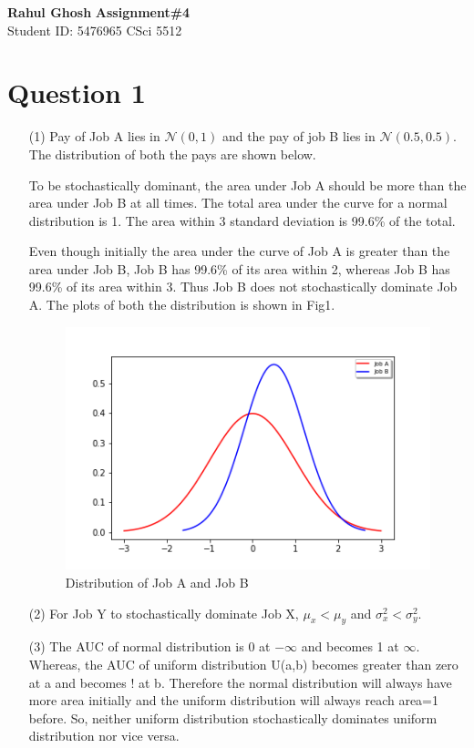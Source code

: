 \documentclass[letter, 10pt]{article}
\begin{document}
\noindent
\large \textbf{Rahul Ghosh} \hfill \textbf{Assignment\#4}\\
\normalsize Student ID: 5476965 \hfill CSci 5512\\

\section*{Question 1}
\begin{itemize}
    \item[(1)] Pay of Job A lies in $\mathcal{N}(0,1)$ and the pay of job B lies in $\mathcal{N}(0.5,0.5)$. The distribution of both the pays are shown below.

    To be stochastically dominant, the area under Job A should be more than the area under Job B at all times. The total area under the curve for a normal distribution is 1. The area within 3 standard deviation is 99.6\% of the total.
    
    Even though initially the area under the curve of Job A is greater than the area under Job B, Job B has 99.6\% of its area within 2, whereas Job B has 99.6\% of its area within 3. Thus Job B does not stochastically dominate Job A. The plots of both the distribution is shown in Fig1.
    
    \begin{figure}[H]
        \centering
        \includegraphics[width=\textwidth, height=0.4\textwidth]{HW4/P1.png}
        \caption{Distribution of Job A and Job B}
    \end{figure}
    
    \item[(2)] For Job Y to stochastically dominate Job X, $\mu_x<\mu_y$ and $\sigma^2_x<\sigma^2_y$.
    
    \item[(3)] The AUC of normal distribution is 0 at $-\infty$ and becomes 1 at $\infty$. Whereas, the AUC of uniform distribution U(a,b) becomes greater than zero at a and becomes ! at b. Therefore the normal distribution will always have more area initially and the uniform distribution will always reach area=1 before. So, neither uniform distribution stochastically dominates uniform distribution nor vice versa.
\end{itemize}
\end{document}

